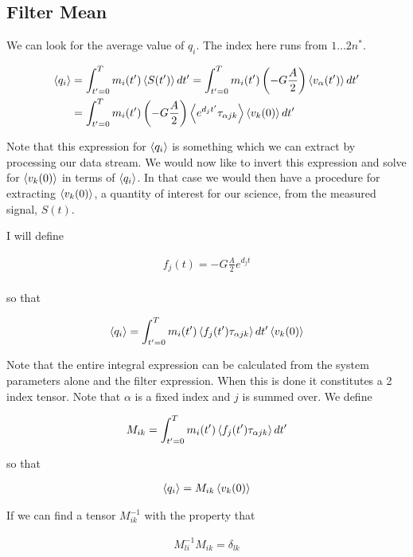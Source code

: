 \documentclass[12pt]{article}
\begin{document}
\subsection{Filter Mean}
We can look for the average value of $q_i$. The index here runs from $1\dotsc 2n^*$.

\begin{align}
\Braket{q_i} &= \int_{t'=0}^T m_i(t') \Braket{S(t')} dt' = \int_{t'=0}^T m_i(t') \left(-G\frac{A}{2}\right)\Braket{v_{\alpha}(t')} dt'\\
&= \int_{t'=0}^T m_i(t')\left(-G\frac{A}{2}\right) \Braket{e^{d_j t'}\tau_{\alpha jk}} \Braket{v_k(0)} dt'
\end{align}

Note that this expression for $\Braket{q_i}$ is something which we can extract by processing our data stream. We would now like to invert this expression and solve for $\Braket{v_k(0)}$ in terms of $\Braket{q_i}$. In that case we would then have a procedure for extracting $\Braket{v_k(0)}$, a quantity of interest for our science, from the measured signal, $S(t)$.

I will define

\begin{align}
f_j(t) = -G\frac{A}{2} e^{d_j t}\\
\end{align}

so that

\begin{align}
\Braket{q_i} =  \int_{t'=0}^T m_i(t')\Braket{f_j(t')\tau_{\alpha jk}} dt' \Braket{v_k(0)}
\end{align}

Note that the entire integral expression can be calculated from the system parameters alone and the filter expression. When this is done it constitutes a 2 index tensor. Note that $\alpha$ is a fixed index and $j$ is summed over. We define

\begin{align}
M_{ik} = \int_{t'=0}^T m_i(t')\Braket{f_j(t')\tau_{\alpha jk}} dt'
\end{align}

so that

\begin{align}
\Braket{q_i} = M_{ik}\Braket{v_k(0)}
\end{align}

If we can find a tensor $M^{-1}_{ik}$ with the property that 

\begin{align}
M^{-1}_{li}M_{ik} = \delta_{lk}
\end{align}
\end{document}
